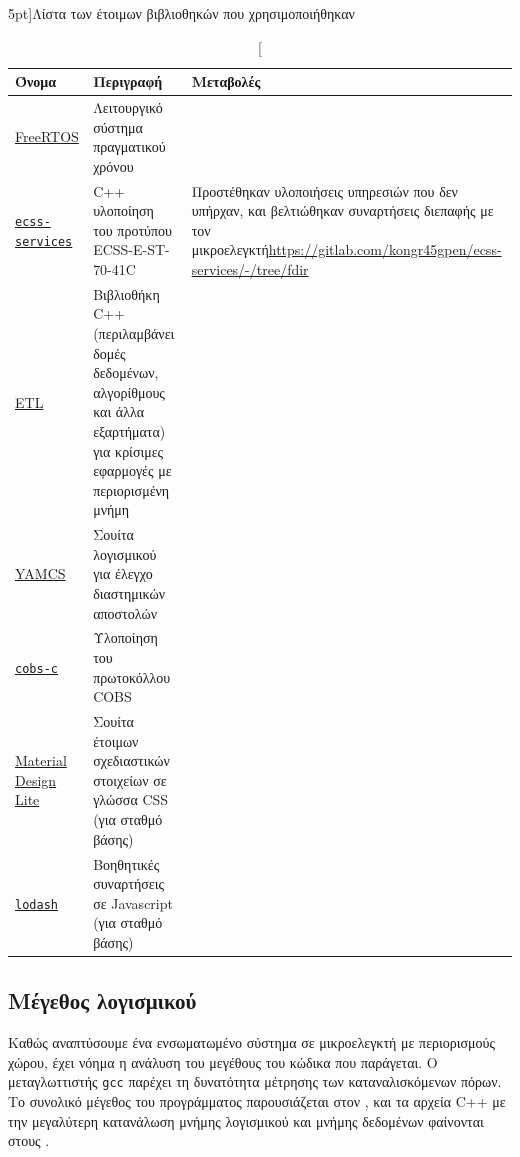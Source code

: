 \documentclass[a4paper,nobib]{tufte-book}
\begin{document}
\begin{table}[h]
	\centering
	\vspace{2em}
	\caption[][5pt]{Λίστα των έτοιμων βιβλιοθηκών που χρησιμοποιήθηκαν}
	\label{tab:old_software}
	\begin{tabularx}{\textwidth}{@{}lp{6cm}X@{}}
		\toprule
		Όνομα & Περιγραφή & Μεταβολές \\ \midrule
		\href{https://www.freertos.org/}{FreeRTOS} & Λειτουργικό σύστημα πραγματικού χρόνου & \\
		\href{https://gitlab.com/acubesat/obc/ecss-services}{\texttt{ecss-services}} & C++ υλοποίηση του προτύπου ECSS-E-ST-70-41C %
		& \small
		Προστέθηκαν υλοποιήσεις υπηρεσιών που δεν υπήρχαν, και βελτιώθηκαν συναρτήσεις διεπαφής με τον μικροελεγκτή\newline\small\url{https://gitlab.com/kongr45gpen/ecss-services/-/tree/fdir}
		 \\
		 \href{https://www.etlcpp.com/}{\acs{ETL}}  & Βιβλιοθήκη C++ (περιλαμβάνει δομές δεδομένων, αλγορίθμους και άλλα εξαρτήματα) για κρίσιμες εφαρμογές με περιορισμένη μνήμη &
		 \\
 		\href{https://github.com/yamcs/yamcs}{\acs{YAMCS}}  & Σουίτα λογισμικού για έλεγχο διαστημικών αποστολών& %
 		\\
		\href{https://github.com/cmcqueen/cobs-c}{\texttt{cobs-c}}  & Υλοποίηση του πρωτοκόλλου \ac{COBS} %
		 & \\
		 \href{https://getmdl.io/}{Material Design Lite}  & Σουίτα έτοιμων σχεδιαστικών στοιχείων σε γλώσσα CSS (για σταθμό βάσης)
		 & \\
		 \href{https://lodash.com/}{\texttt{lodash}}  & Βοηθητικές συναρτήσεις σε Javascript (για σταθμό βάσης)
		 & \\
		\bottomrule
	\end{tabularx}
\end{table}

\FloatBarrier
\subsection{Μέγεθος λογισμικού}
Καθώς αναπτύσουμε ένα ενσωματωμένο σύστημα σε μικροελεγκτή με περιορισμούς χώρου, έχει νόημα η ανάλυση του μεγέθους του κώδικα που παράγεται. Ο μεταγλωττιστής \texttt{gcc} παρέχει τη δυνατότητα μέτρησης των καταναλισκόμενων πόρων. Το συνολικό μέγεθος του προγράμματος παρουσιάζεται στον , και τα αρχεία C++ με την μεγαλύτερη κατανάλωση μνήμης λογισμικού και μνήμης δεδομένων φαίνονται στους .
\end{document}
